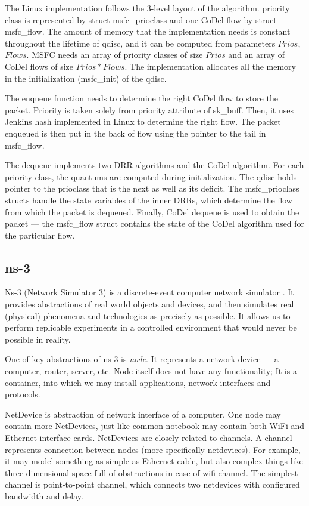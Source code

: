 The Linux implementation follows the 3-level layout of the algorithm. priority class is represented by struct msfc\_prioclass and one CoDel flow by struct msfc\_flow. The amount of memory that the implementation needs is constant throughout the lifetime of qdisc, and it can be computed from parameters $Prios$, $Flows$. MSFC needs an array of priority classes of size $Prios$ and an array of CoDel flows of size $Prios * Flows$. The implementation allocates all the memory in the initialization (msfc\_init) of the qdisc.

The enqueue function needs to determine the right CoDel flow to store the packet. Priority is taken solely from priority attribute of sk\_buff. Then, it uses Jenkins hash implemented in Linux to determine the right flow. The packet enqueued is then put in the back of flow using the pointer to the tail in msfc\_flow. 

The dequeue implements two DRR algorithms and the CoDel algorithm. For each priority class, the quantums are computed during initialization. The qdisc holds pointer to the prioclass that is the next as well as its deficit. The msfc\_prioclass structs handle the state variables of the inner DRRs, which determine the flow from which the packet is dequeued. Finally, CoDel dequeue is used to obtain the packet --- the msfc\_flow struct contains the state of the CoDel algorithm used for the particular flow.

\subsection {ns-3}

Ns-3 (Network Simulator 3) is a discrete-event computer network simulator \cite{ns3}. It provides abstractions of real world objects and devices, and then simulates real (physical) phenomena and technologies as precisely as possible.  It allows us to perform replicable  experiments in a controlled environment that would never be possible in reality.

One of key abstractions of ns-3 is \emph{node}. It represents a network device --- a computer, router, server, etc. Node itself does not have any functionality; It is a container, into which we may install applications, network interfaces and protocols.

NetDevice is abstraction of network interface of a computer. One node may contain more NetDevices, just like common notebook may contain both WiFi and Ethernet interface cards. NetDevices are closely related to channels. A channel represents connection between nodes (more specifically netdevices). For example, it may model something as simple as Ethernet cable, but also complex things like three-dimensional space full of obstructions in case of wifi channel. The simplest channel is point-to-point channel, which connects two netdevices with configured bandwidth and delay.

